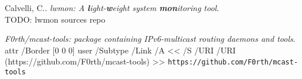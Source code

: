 \documentclass[a4paper,11pt,twocolumn]{article}
\newcommand{\longurl}[2]{%
\pdfstartlink %
attr {/Border [0 0 0]} %
user {/Subtype /Link /A << /S /URI /URI (#1) >>}%
{\footnotesize\tt #2}\pdfendlink}
\newcommand{\url}[1]{\longurl{#1}{#1}}
\newcommand{\url}[1]{{\footnotesize\tt #1}}
\newcommand{\longurl}[2]{{\footnotesize\tt #1}}
\begin{document}
\begin{thebibliography}{99}
  Calvelli, C..
  {\em lwmon: A {\bf\em l}ight-{\bf\em w}eight system {\bf\em mon}itoring tool}.\\
  TODO: lwmon sources repo

  {\em F0rth/mcast-tools: package containing IPv6-multicast
  routing daemons and tools}.\\
  \url{https://github.com/F0rth/mcast-tools}


\end{thebibliography}
\end{document}
